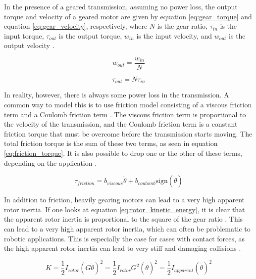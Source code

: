     In the presence of a geared transmission, assuming no power loss, the output torque and velocity of a geared motor are given by equation \ref{eq:gear_torque} and equation \ref{eq:gear_velocity}, respectively, where $N$ is the gear ratio, $\tau_{in}$ is the input torque, $\tau_{out}$ is the output torque, $w_{in}$ is the input velocity, and $w_{out}$ is the output velocity \cite{modern_robotics_book}.

    \begin{equation}
        \label{eq:gear_torque}
        w_ {out} = \frac{w_{in}}{N}
    \end{equation}

    \begin{equation}
        \label{eq:gear_velocity}
        \tau_{out} = N\tau_{in}
    \end{equation}

    In reality, however, there is always some power loss in the transmission. A common way to model this is to use friction model consisting of a viscous friction term and a Coulomb friction term \cite{modern_robotics_book}. The viscous friction term is proportional to the velocity of the transmission, and the Coulomb friction term is a constant friction torque that must be overcome before the transmission starts moving. The total friction torque is the sum of these two terms, as seen in equation \ref{eq:friction_torque}. It is also possible to drop one or the other of these terms, depending on the application \cite{modern_robotics_book}.

    \begin{equation}
        \label{eq:friction_torque}
        \tau_{friction} = b_{viscous}\dot{\theta} + b_{coulomb}\text{sign}(\dot{\theta})  
    \end{equation}

    In addition to friction, heavily gearing motors can lead to a very high apparent rotor inertia. If one looks at equation \ref{eq:rotor_kinetic_energy}, it is clear that the apparent rotor inertia is proportional to the square of the gear ratio \cite{modern_robotics_book}. This can lead to a very high apparent rotor inertia, which can often be problematic to robotic applications. This is especially the case for cases with contact forces, as the high apparent rotor inertia can lead to very stiff and damaging collisions \cite{proprioceptive}.

    \begin{equation}
        \label{eq:rotor_kinetic_energy}
        K = \frac{1}{2}{I}_{rotor}(G\dot\theta)^2 = \frac{1}{2}{I}_{rotor}G^2(\dot\theta)^2 = \frac{1}{2}I_{apparent}(\dot\theta)^2
    \end{equation}

